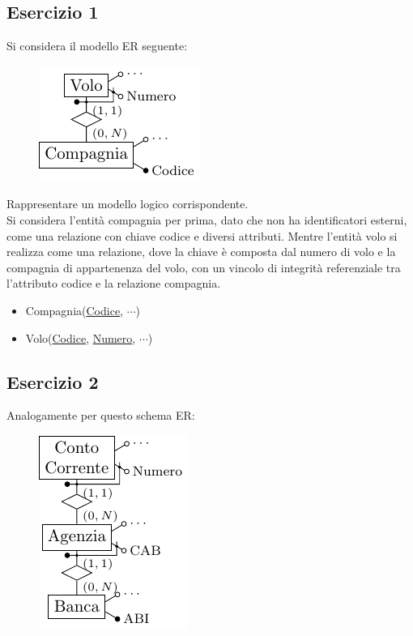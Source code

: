 \documentclass{article}
\numberwithin{equation}{subsection}
\begin{document}
\subsection{Esercizio 1}

Si considera il modello ER seguente:
\begin{figure}[H]%
    \centering%
    \includegraphics[scale=1.25]{schema_voli_25-11-24_2.pdf}%
\end{figure}

Rappresentare un modello logico corrispondente. \\
Si considera l'entità compagnia per prima, dato che non ha identificatori esterni, come una relazione con chiave codice e diversi 
attributi. Mentre l'entità volo si realizza come una relazione, dove la chiave è composta dal numero di volo e la compagnia di appartenenza del 
volo, con un vincolo di integrità referenziale tra l'attributo codice e la relazione compagnia.  
\begin{itemize}
    \item Compagnia(\underline{Codice}, $\cdots$)
    \item Volo(\underline{Codice}, \underline{Numero}, $\cdots$)
\end{itemize}

\subsection{Esercizio 2}

Analogamente per questo schema ER:

\begin{figure}[H]%
    \centering%
    \includegraphics[scale=1.25]{schema_banca_25-11-24.pdf}%
\end{figure}
\end{document}
